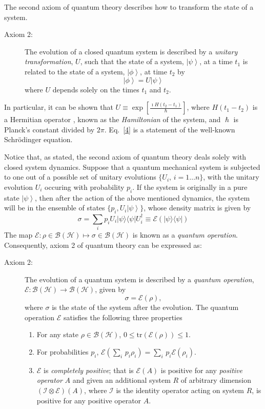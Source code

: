 \documentclass{article}
\newcommand{\ket}[1]{\left|#1\right\rangle}
\newcommand\defn[1]{\textsl{#1}}
\newcommand\ketbra[1]{|#1\rangle\langle#1|}
\newcommand\cH{{\mathscr{H}}}
\newcommand\cI{{\mathcal I}}
\newcommand\cB{{\mathcal B}}
\newcommand\cE{{\mathcal E}}
\begin{document}
The second axiom of quantum theory describes how to transform the state of a
system.
\begin{description}
\item[Axiom 2:]  The evolution of a closed quantum system is described by a {\em unitary transformation}, $U$, such that the state of a system, $\ket{\psi}$, at a time $t_1$ is related to the state of a system, $\ket{\phi}$, at time $t_2$ by
\begin{equation}
\ket{\phi}=U\ket{\psi}
\label{4}
\end{equation}
where $U$ depends solely on the times $t_1$ and $t_2$.  
\end{description}
In particular, it can be shown that $U\equiv\exp\left[\frac{\imath H(t_2-t_1)}{\hslash}\right]$, where $H(t_1-t_2)$ is a Hermitian operator , known as the \defn{Hamiltonian} of the system, and $\hslash$ is Planck's constant divided by $2\pi$.  Eq.~\eqref{4} is a statement of the well-known Schr\"{o}dinger equation.

Notice that, as stated, the second axiom of quantum theory deals solely with closed system dynamics.  Suppose that a quantum mechanical system is subjected to one out of a possible set of unitary evolutions $\{U_i,\, i=1\ldots n\}$, with the unitary evolution $U_i$ occuring with probability $p_i$.  If the system is originally in a pure state $\ket{\psi}$, then after the action of the above mentioned dynamics, the system will be in the ensemble of states $\{p_i, U_i\ket{\psi}\}$, whose density matrix is given by 
\begin{equation}
\sigma=\sum_i p_i U_i\ketbra{\psi} U_i^\dagger\equiv\cE(\ketbra{\psi})
\label{5}
\end{equation}   
The map $\cE: \rho\in\cB(\cH)\mapsto \sigma\in\cB(\cH)$ is known as a \defn{quantum operation}.  Consequently, axiom 2 of quantum theory can be expressed as: 
\begin{description}
\item[Axiom 2:]  The evolution of a quantum system is described by a
\defn{quantum operation}, $\cE:\cB(\cH)\rightarrow\cB(\cH)$, 
given by
\begin{equation}
\sigma=\cE(\rho),
\label{6}
\end{equation}
where $\sigma$ is the state of the system after the evolution.  The quantum
operation $\cE$ satisfies the following three properties
\begin{enumerate}
\item For any state $\rho\in\cB(\cH)$,
$0\leq\mathrm{tr}\left(\cE(\rho)\right)\leq 1$.
\item For probabilities $p_i$, $\cE\left(\sum_i\,
p_i\rho_i\right)=\sum_i\,p_i\cE(\rho_i)$.
\item $\cE$ is \defn{completely positive}; that is $\cE(A)$ is positive for any
\defn{positive operator} $A$ and given an 
additional system $R$ of arbitrary dimension $(\cI\otimes \cE)(A)$, where $\cI$
is the identity operator acting on system $R$, 
is positive for any positive operator $A$.
\end{enumerate}
\end{description}
\end{document}
